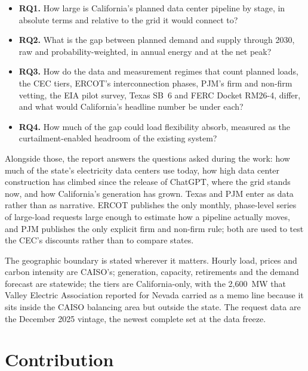 \begin{itemize}
\item \textbf{RQ1.} How large is California's planned data center pipeline by stage, in absolute terms and relative to the grid it would connect to?
\item \textbf{RQ2.} What is the gap between planned demand and supply through 2030, raw and probability-weighted, in annual energy and at the net peak?
\item \textbf{RQ3.} How do the data and measurement regimes that count planned loads, the CEC tiers, ERCOT's interconnection phases, PJM's firm and non-firm vetting, the EIA pilot survey, Texas SB~6 and FERC Docket RM26-4, differ, and what would California's headline number be under each?
\item \textbf{RQ4.} How much of the gap could load flexibility absorb, measured as the curtailment-enabled headroom of the existing system?
\end{itemize}

Alongside those, the report answers the questions asked during the work: how much of the state's electricity data centers use today, how high data center construction has climbed since the release of ChatGPT, where the grid stands now, and how California's generation has grown. Texas and PJM enter as data rather than as narrative. ERCOT publishes the only monthly, phase-level series of large-load requests large enough to estimate how a pipeline actually moves, and PJM publishes the only explicit firm and non-firm rule; both are used to test the CEC's discounts rather than to compare states.

The geographic boundary is stated wherever it matters. Hourly load, prices and carbon intensity are CAISO's; generation, capacity, retirements and the demand forecast are statewide; the tiers are California-only, with the 2,600~MW that Valley Electric Association reported for Nevada carried as a memo line because it sits inside the CAISO balancing area but outside the state. The request data are the December 2025 vintage, the newest complete set at the data freeze.

\section{Contribution}

